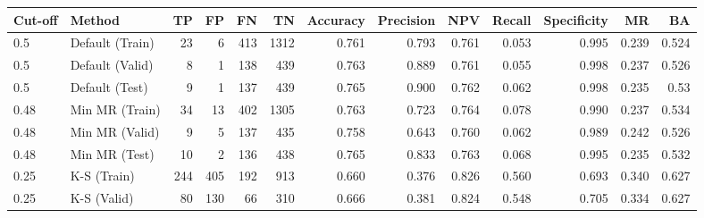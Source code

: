 \begin{table}[H]
	\centering
	\resizebox{\textwidth}{!}
	{
	\begin{tabular}{l|l|r|r|r|r|r|r|r|r|r|r|r}
		\hline
		\textbf{Cut-off} & \textbf{Method}       & \textbf{TP} & \textbf{FP} & \textbf{FN} & \textbf{TN} & \textbf{Accuracy} & \textbf{Precision} & \textbf{NPV} & \textbf{Recall} & \textbf{Specificity} & \textbf{MR} & \textbf{BA} \\ \hline
		0.5              & Default (Train)       & 23          & 6           & 413         & 1312        & 0.761             & 0.793              & 0.761        & 0.053           & 0.995                & 0.239  & 0.524      \\
		0.5              & Default (Valid)       & 8           & 1           & 138         & 439         & 0.763             & 0.889              & 0.761        & 0.055           & 0.998                & 0.237   & 0.526    \\
		0.5              & Default (Test)        & 9           & 1           & 137         & 439         & 0.765             & 0.900              & 0.762        & 0.062           & 0.998                & 0.235      & 0.53  \\ \hline
		0.48             & Min MR (Train)        & 34          & 13          & 402         & 1305        & 0.763             & 0.723              & 0.764        & 0.078           & 0.990                & 0.237     & 0.534  \\
		0.48             & Min MR (Valid)        & 9           & 5           & 137         & 435         & \cellcolor{yellow!25}0.758             & \cellcolor{yellow!25}0.643              & 0.760        & 0.062           & \cellcolor{yellow!25}0.989                & \cellcolor{yellow!25}0.242       & 0.526 \\
		0.48             & Min MR (Test)         & 10          & 2           & 136         & 438         & 0.765             & 0.833              & 0.763        & 0.068           & 0.995                & 0.235    & 0.532   \\ \hline
		0.25             & K-S (Train) & 244         & 405         & 192         & 913         & 0.660             & 0.376              & 0.826        & 0.560           & 0.693                & 0.340  & 0.627     \\
		0.25             & K-S (Valid) & 80          & 130         & 66          & 310         & 0.666             & 0.381              & \cellcolor{yellow!25}0.824        & \cellcolor{yellow!25}0.548           & 0.705                & 0.334     & \cellcolor{yellow!25}0.627  \\

\end{tabular}}
\end{table}
